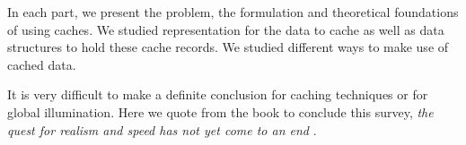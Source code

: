 \documentclass[]{book}
\begin{document}
In each part, we present the problem, the formulation and theoretical foundations of using caches.
We studied representation for the data to cache as well as data structures to hold these cache records.
We studied different ways to make use of cached data.

It is very difficult to make a definite conclusion for caching techniques or for global illumination.
Here we quote \citeauthor{AdvancedGI} from the book  to conclude this survey, \textit{the quest for realism and speed has not yet come
to an end} \cite{AdvancedGI}.

\printbibliography
{}
\end{document}

